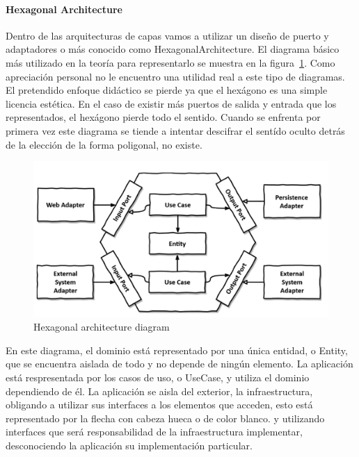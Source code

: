 
\paragraph{Hexagonal Architecture}

Dentro de las arquitecturas de capas vamos a utilizar un diseño de puerto y adaptadores o más conocido como \gls{HexagonalArchitecture}. El diagrama básico más utilizado en la teoría para representarlo se muestra en la figura~\cref{fig:hexagonalDiagram}. Como apreciación personal no le encuentro una utilidad real a este tipo de diagramas. El pretendido enfoque didáctico se pierde ya que el hexágono es una simple licencia estética. En el caso de existir más puertos de salida y entrada que los representados, el hexágono pierde todo el sentido. Cuando se enfrenta por primera vez este diagrama se tiende a intentar descifrar el sentído oculto detrás de la elección de la forma poligonal, no existe.

\begin{figure}[H]
    \centering
    \includegraphics[height=0.3\textheight]{./part/Ejecucion/Seguimiento/CreateTaskUseCase/img/HexagonalDiagram}
    \caption{Hexagonal architecture diagram\cite{TomHombergs2019GYHD}}\label{fig:hexagonalDiagram}
\end{figure}

En este diagrama, el dominio está representado por una única entidad, o Entity, que se encuentra aislada de todo y no depende de ningún elemento.
La aplicación está respresentada por los casos de uso, o UseCase, y utiliza el dominio dependiendo de él.
La aplicación se aisla del exterior, la infraestructura, obligando a utilizar sus interfaces a los elementos que acceden, esto está representado por la flecha con cabeza hueca o de color blanco.
y utilizando interfaces que será responsabilidad de la infraestructura implementar, desconociendo la aplicación su implementación particular.

